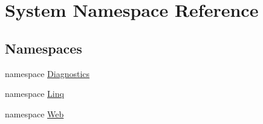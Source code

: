 \hypertarget{namespaceSystem}{}\section{System Namespace Reference}
\label{namespaceSystem}
\subsection*{Namespaces}
\begin{DoxyCompactItemize}
\item 
namespace \hyperlink{namespaceSystem_1_1Diagnostics}{Diagnostics}
\item 
namespace \hyperlink{namespaceSystem_1_1Linq}{Linq}
\item 
namespace \hyperlink{namespaceSystem_1_1Web}{Web}
\end{DoxyCompactItemize}
